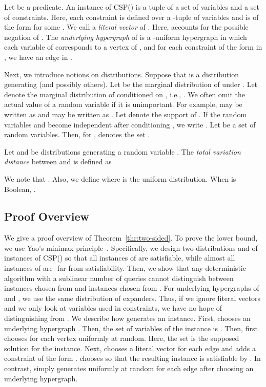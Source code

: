 \documentclass[letterpaper,11pt]{article}
\newcommand{\csp}[1]{\textsf{CSP}(#1)\xspace}
\begin{document}
Let  be a predicate.
An instance  of \csp{} is a tuple of a set of variables and a set of constraints.
Here, each constraint  is defined over a -tuple of variables  and is of the form  for some .
We call  a \textit{literal vector} of .
Here,  accounts for the possible negation of .
The \textit{underlying hypergraph} of  is a -uniform hypergraph  in which each variable of  corresponds to a vertex of ,
and for each constraint of the form  in , 
we have an edge  in .

Next, we introduce notions on distributions.
Suppose that  is a distribution generating  (and possibly others).
Let  be the marginal distribution of  under .
Let  denote the marginal distribution of  conditioned on , i.e., .
We often omit the actual value of a random variable if it is unimportant.
For example,  may be written as  and  may be written as .
Let  denote the support of .
If the random variables  and  become independent after conditioning , 
we write .
Let  be a set of random variables.
Then, for ,  denotes the set .

Let  and  be distributions generating a random variable .
The \textit{total variation distance} between  and  is defined as

We note that .
Also, we define  where  is the uniform distribution.
When  is Boolean, .

\subsection{Proof Overview}\label{sec:overview}
We give a proof overview of Theorem~\ref{thr:two-sided}.
To prove the lower bound, we use Yao's minimax principle~\cite{Yao77}.
Specifically, 
we design two distributions  and  of instances of \csp{} so that all instances of  are satisfiable,
while almost all instances of  are -far from satisfiability.
Then, we show that any deterministic algorithm with a sublinear number of queries cannot distinguish between instances chosen from  and instances chosen from .
For underlying hypergraphs of  and , 
we use the same distribution of expanders. 
Thus, if we ignore literal vectors and we only look at variables used in constraints,
we have no hope of distinguishing  from .
We describe how  generates an instance.
First,  chooses an underlying hypergraph .
Then, the set of variables of the instance is .
Then,  first chooses  for each vertex  uniformly at random.
Here, the set  is the supposed solution for the instance.
Next,  chooses a literal vector  for each edge  and adds a constraint  of the form .
 chooses  so that the resulting instance is satisfiable by .
In contrast,  simply generates  uniformly at random for each edge  after choosing an underlying hypergraph.
\end{document}
